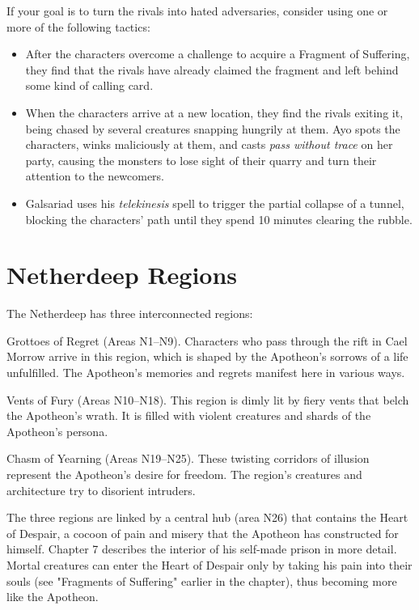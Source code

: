 \documentclass[10pt,a4paper,twoside,fancy,bg=print,twocolumn,openany,nodeprecatedcode]{dndbook}
\begin{document}
If your goal is to turn the rivals into hated adversaries, consider using one or more of the following tactics:


\begin{itemize}
\item After the characters overcome a challenge to acquire a Fragment of Suffering, they find that the rivals have already claimed the fragment and left behind some kind of calling card.
\item When the characters arrive at a new location, they find the rivals exiting it, being chased by several creatures snapping hungrily at them. Ayo spots the characters, winks maliciously at them, and casts \textit{pass without trace} on her party, causing the monsters to lose sight of their quarry and turn their attention to the newcomers.
\item Galsariad uses his \textit{telekinesis} spell to trigger the partial collapse of a tunnel, blocking the characters' path until they spend 10 minutes clearing the rubble.
\end{itemize}

\section{Netherdeep Regions}
The Netherdeep has three interconnected regions:

Grottoes of Regret (Areas N1–N9). Characters who pass through the rift in Cael Morrow arrive in this region, which is shaped by the Apotheon's sorrows of a life unfulfilled. The Apotheon's memories and regrets manifest here in various ways.

Vents of Fury (Areas N10–N18). This region is dimly lit by fiery vents that belch the Apotheon's wrath. It is filled with violent creatures and shards of the Apotheon's persona.

Chasm of Yearning (Areas N19–N25). These twisting corridors of illusion represent the Apotheon's desire for freedom. The region's creatures and architecture try to disorient intruders.

The three regions are linked by a central hub (area N26) that contains the Heart of Despair, a cocoon of pain and misery that the Apotheon has constructed for himself. Chapter 7 describes the interior of his self-made prison in more detail. Mortal creatures can enter the Heart of Despair only by taking his pain into their souls (see "Fragments of Suffering" earlier in the chapter), thus becoming more like the Apotheon.
\end{document}
